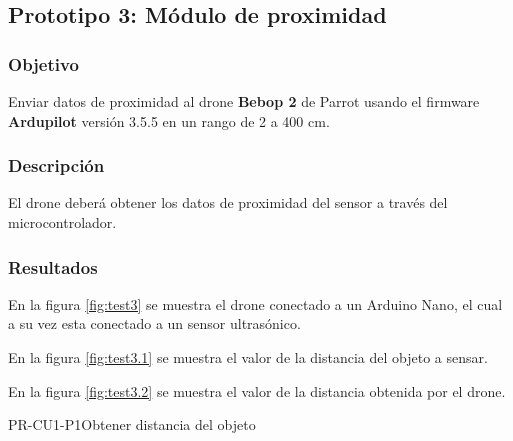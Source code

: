 \subsection{Prototipo 3: Módulo de proximidad}

\subsubsection{Objetivo}
Enviar datos de proximidad al drone \textbf{Bebop 2} de Parrot usando el firmware \textbf{Ardupilot} versión 3.5.5 en un rango de 2 a 400 cm.

\subsubsection{Descripción}
El drone deberá obtener los datos de proximidad del sensor a través del microcontrolador.

\subsubsection{Resultados}
En la figura \ref{fig:test3} se muestra el drone conectado a un Arduino Nano, el cual a su vez esta conectado a un sensor ultrasónico.

En la figura \ref{fig:test3.1} se muestra el valor de la distancia del objeto a sensar.

En la figura \ref{fig:test3.2} se muestra el valor de la distancia obtenida por el drone.




\begin{prueba}{PR-CU1-P1}{Obtener distancia del objeto}
\end{prueba}
